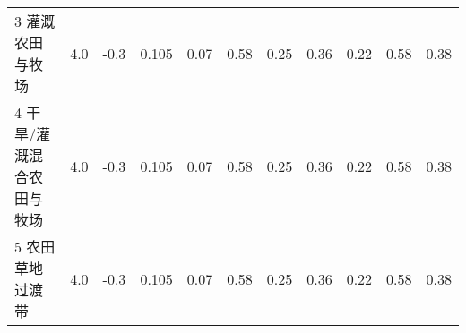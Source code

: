 \begin{sidewaystable}[]
\begin{tabular}{@{}lcccccccccc@{}}
    3 灌溉农田与牧场      & 4.0        & -0.3                                                                         & 0.105                                                                                                           & 0.07                                                                                                            & 0.58                                                                                                            & 0.25                                                                                                            & 0.36                                                                                                            & 0.22                                                                                                            & 0.58                                                                                                            & 0.38                                                                                                            \\
    4 干旱/灌溉混合农田与牧场 & 4.0        & -0.3                                                                         & 0.105                                                                                                           & 0.07                                                                                                            & 0.58                                                                                                            & 0.25                                                                                                            & 0.36                                                                                                            & 0.22                                                                                                            & 0.58                                                                                                            & 0.38                                                                                                            \\
    5 农田草地过渡带      & 4.0        & -0.3                                                                         & 0.105                                                                                                           & 0.07                                                                                                            & 0.58                                                                                                            & 0.25                                                                                                            & 0.36                                                                                                            & 0.22                                                                                                            & 0.58                                                                                                            & 0.38                                                                                                            \\

\end{tabular}
\end{sidewaystable}
